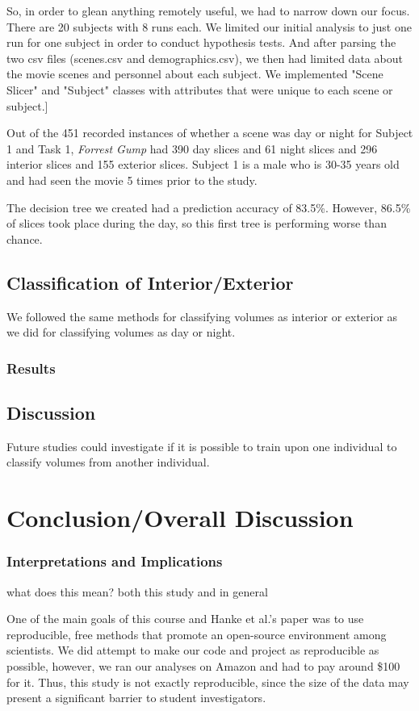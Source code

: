 \documentclass[11pt]{article}
\begin{document}
So, in order to glean anything remotely useful, we had to narrow down our
focus. There are 20 subjects with 8 runs each. We limited our initial analysis
to just one run for one subject in order to conduct hypothesis tests. And
after parsing the two csv files (scenes.csv and demographics.csv), we then had
limited data about the movie scenes and personnel about each subject. We
implemented "Scene Slicer" and "Subject" classes with attributes that were
unique to each scene or subject.]

Out of the 451 recorded instances of whether a scene was day or night for
Subject 1 and Task 1, \emph{Forrest Gump} had 390 day slices and 61 night slices and 296 interior slices and 155 exterior slices. Subject 1 is a male 
who is 30-35 years old and had seen the movie 5 times prior to the study.

The decision tree we created had a prediction accuracy of 83.5\%.  However,
86.5\% of slices took place during the day, so this first tree is performing
worse than chance.

\subsection{Classification of Interior/Exterior}
We followed the same methods for classifying volumes as interior or exterior
as we did for classifying volumes as day or night.

\subsubsection{Results}

\subsection{Discussion}
Future studies could investigate if it is possible to train upon one individual 
to classify volumes from another individual.

\section{Conclusion/Overall Discussion}

\subsubsection{Interpretations and Implications}
what does this mean? both this study and in general

One of the main goals of this course and Hanke et al.'s paper was to use
reproducible, free methods that promote an open-source environment among
scientists.  We did attempt to make our code and project as reproducible as
possible, however, we ran our analyses on Amazon and had to pay around \$100
for it.  Thus, this study is not exactly reproducible, since the size of the
data may present a significant barrier to student investigators.
\end{document}
